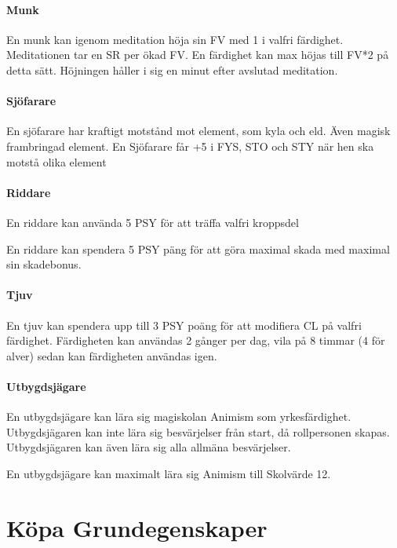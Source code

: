 \documentclass[a4paper, 10pt, titlepage]{article}
\begin{document}
\paragraph{Munk} En munk kan igenom meditation höja sin FV med 1 i valfri färdighet.
Meditationen tar en SR per ökad FV. En färdighet kan max höjas till FV*2 på detta sätt.
Höjningen håller i sig en minut efter avslutad meditation.

\paragraph{Sjöfarare} En sjöfarare har kraftigt motstånd mot element, som kyla och eld.
Även magisk frambringad element. En Sjöfarare får +5 i FYS, STO och STY när hen ska
motstå olika element

\paragraph{Riddare} En riddare kan använda 5 PSY för att träffa valfri kroppsdel

En riddare kan spendera 5 PSY päng för att göra maximal skada med maximal sin skadebonus.

\paragraph{Tjuv} En tjuv kan spendera upp till 3 PSY poäng för att modifiera CL på valfri
färdighet. Färdigheten kan användas 2 gånger per dag, vila på 8 timmar (4 för alver) sedan
kan färdigheten användas igen.

\paragraph{Utbygdsjägare} En utbygdsjägare kan lära sig magiskolan Animism som yrkesfärdighet.
Utbygdsjägaren kan inte lära sig besvärjelser från start, då rollpersonen skapas.
Utbygdsjägaren kan även lära sig alla allmäna besvärjelser.

En utbygdsjägare kan maximalt lära sig Animism till Skolvärde 12.


\section{Köpa Grundegenskaper}
\end{document}
